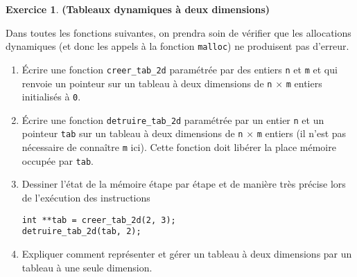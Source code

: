 \documentclass[12pt]{article}
\theoremstyle{definition}
\newtheorem{Exercice}{Exercice}
\begin{document}
\begin{Exercice} {\bf (Tableaux dynamiques à deux dimensions)}\smallskip

Dans toutes les fonctions suivantes, on prendra soin de vérifier que
les allocations dynamiques (et donc les appels à la fonction {\tt malloc})
ne produisent pas d'erreur.
\begin{enumerate}
    \item Écrire une fonction {\tt creer\_tab\_2d} paramétrée par des
    entiers {\tt n} et {\tt m} et qui renvoie un pointeur sur un tableau
    à deux dimensions de {\tt n} $\times$ {\tt m} entiers initialisés
    à {\tt 0}.
    \smallskip

    \item Écrire une fonction {\tt detruire\_tab\_2d} paramétrée par un
    entier {\tt n} et un pointeur {\tt tab} sur un tableau à deux
    dimensions de {\tt n} $\times$ {\tt m} entiers (il n'est pas
    nécessaire de connaître {\tt m} ici). Cette fonction doit libérer la
    place mémoire occupée par {\tt tab}.
    \smallskip

    \item Dessiner l'état de la mémoire étape par étape et de manière
    très précise lors de l'exécution des instructions
\begin{lstlisting}
int **tab = creer_tab_2d(2, 3);
detruire_tab_2d(tab, 2);
\end{lstlisting}
    \smallskip

    \item Expliquer comment représenter et gérer un tableau à deux
    dimensions par un tableau à une seule dimension.
\end{enumerate}
\end{Exercice}
\bigskip
\end{document}
